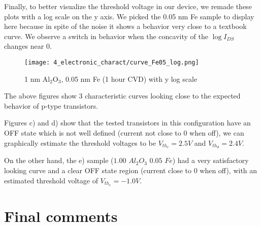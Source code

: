 \documentclass[a4paper,12pt,twoside]{article}
\begin{document}
Finally, to better visualize the threshold voltage in our device, we remade these plots with a log scale on the y axis. We picked the 0.05 nm Fe sample to display here because in spite of the noise it shows a behavior very close to a textbook curve. We observe a switch in behavior when the concavity of the $\log{I_{DS}}$ changes near 0.

\begin{figure}[H]
    \centering
    \texttt{[image: 4\_electronic\_charact/curve\_Fe05\_log.png]}
    \caption{\scriptsize{1 nm Al$_2$O$_3$, 0.05 nm Fe (1 hour CVD) with y log scale}}
    \label{fig:logscale}
\end{figure}

The above figures show 3 characteristic curves looking close to the expected behavior of p-type transistors.

Figures c) and d) show that the tested transistors in this configuration have an OFF state which is not well defined (current not close to 0 when off), we can graphically estimate the threshold voltages to be $V_{th_{c}} = 2.5V$ and $V_{th_{d}} = 2.4V$.

On the other hand, the e) sample ($1.00$ $Al_2O_3$ $0.05$ $Fe$) had a very satisfactory looking curve and a clear OFF state region (current close to 0 when off), with an estimated threshold voltage of $V_{th_{e}} = -1.0 V$.


\newpage
\section*{Final comments}
\end{document}
